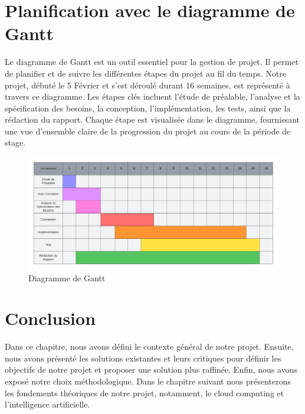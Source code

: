\section{Planification avec le diagramme de Gantt}
Le diagramme de Gantt est un outil essentiel pour la gestion de projet. Il permet de planifier et de suivre les différentes étapes du projet au fil du temps. Notre projet, débuté le 5 Février et s’est déroulé durant 16 semaines, est représenté à travers ce diagramme. Les étapes clés incluent l'étude de préalable, l'analyse et la spécification des besoins, la conception, l'implémentation, les tests, ainsi que la rédaction du rapport. Chaque étape est visualisée dans le diagramme, fournissant une vue d'ensemble claire de la progression du projet au cours de la période de stage.
\begin{figure}[H]
    \centering
    \includegraphics[width=1\textwidth,height=0.5\textwidth]{images/chapitre-1/gant.png}
    \caption{Diagramme de Gantt}
    \label{fig:gantt-diagram}    
\end{figure}

\section*{Conclusion}
Dans ce chapitre, nous avons défini le contexte général de notre projet. Ensuite, nous avons présenté les solutions existantes et leurs critiques pour définir les objectifs de notre projet et proposer une solution plus raffinée. Enfin, nous avons exposé notre choix méthodologique. Dans le chapitre suivant nous présenterons les fondements théoriques de notre projet, notamment, le cloud computing et l’intelligence artificielle.
